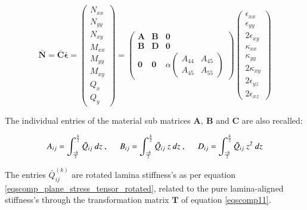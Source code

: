 \begin{equation} 
\bar{\mathbf{N}} = \bar{\mathbf{C}} \bar{\boldsymbol{\epsilon}} =
\begin{pmatrix}
N_{xx} \\
N_{yy} \\
N_{xy} \\
M_{xx} \\
M_{yy} \\
M_{xy} \\
Q_{x} \\
Q_{y} 
\end{pmatrix} 
=
\begin{pmatrix}
\mathbf{A} & \mathbf{B} & \mathbf{0} \\
\mathbf{B} & \mathbf{D} & \mathbf{0} \\
\mathbf{0}& \mathbf{0} & \alpha		\begin{pmatrix}
{A}_{44} & {A}_{45} \\
{A}_{45} & {A}_{55} 
\end{pmatrix} 
\end{pmatrix} 
\begin{pmatrix}
\epsilon_{xx} \\
\epsilon_{yy} \\
2\epsilon_{xy}\\
\kappa_{xx}\\
\kappa_{yy}\\
2\kappa_{xy} \\
2\epsilon_{yz} \\
2\epsilon_{xz}
\end{pmatrix}
\label{eqscomp_laminate_form1}
\end{equation}

The individual entries of the material sub matrices $\mathbf{A},\ \mathbf{B}$ and $\mathbf{C}$ are also recalled:

\begin{equation} 
A_{ij} = 
\int_{\frac{-h}{2}}^{\frac{h}{2}}
\bar{Q}_{ij}
\ dz\ ,
\hspace{5mm}
B_{ij} = 
\int_{\frac{-h}{2}}^{\frac{h}{2}}
\bar{Q}_{ij}\ z
\ dz\ ,
\hspace{5mm}
D_{ij} = 
\int_{\frac{-h}{2}}^{\frac{h}{2}}
\bar{Q}_{ij}\ z^2
\ dz
\label{eqscomp_laminate_form2}
\end{equation}

The entries $\bar{Q}_{ij}^{(k)}$ are rotated lamina stiffness's as per equation \ref{eqscomp_plane_stress_tensor_rotated}, related to the pure lamina-aligned stiffness's through the transformation matrix $\mathbf{T}$ of equation \ref{eqscomp11}.

